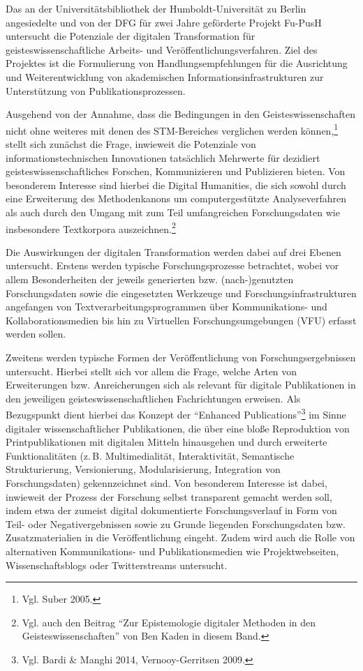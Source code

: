 \documentclass[a4paper,
fontsize=11pt,
oneside,
numbers=noperiodatend,
parskip=half-,
bibliography=totoc,
final
]{scrartcl}
\begin{document}
Das an der Universitätsbibliothek der Humboldt-Universität zu Berlin
angesiedelte und von der DFG für zwei Jahre geförderte Projekt Fu-PusH
untersucht die Potenziale der digitalen Transformation für
geisteswissenschaftliche Arbeits- und Veröffentlichungsverfahren. Ziel
des Projektes ist die Formulierung von Handlungsempfehlungen für die
Ausrichtung und Weiterentwicklung von akademischen
Informationsinfrastrukturen zur Unterstützung von Publikationsprozessen.

Ausgehend von der Annahme, dass die Bedingungen in den
Geisteswissenschaften nicht ohne weiteres mit denen des STM-Bereiches
verglichen werden können,\footnote{Vgl. Suber 2005.} stellt sich
zunächst die Frage, inwieweit die Potenziale von informationstechnischen
Innovationen tatsächlich Mehrwerte für dezidiert
geisteswissenschaftliches Forschen, Kommunizieren und Publizieren
bieten. Von besonderem Interesse sind hierbei die Digital Humanities,
die sich sowohl durch eine Erweiterung des Methodenkanons um
computergestützte Analyseverfahren als auch durch den Umgang mit zum
Teil umfangreichen Forschungsdaten wie insbesondere Textkorpora
auszeichnen.\footnote{Vgl. auch den Beitrag \enquote{Zur Epistemologie
  digitaler Methoden in den Geisteswissenschaften} von Ben Kaden in
  diesem Band.}

Die Auswirkungen der digitalen Transformation werden dabei auf drei
Ebenen untersucht. Erstens werden typische Forschungsprozesse
betrachtet, wobei vor allem Besonderheiten der jeweils generierten bzw.
(nach-)genutzten Forschungsdaten sowie die eingesetzten Werkzeuge und
Forschungsinfrastrukturen angefangen von Textverarbeitungsprogrammen
über Kommuni\-kations- und Kollaborationsmedien bis hin zu Virtuellen
Forschungsumgebungen (VFU) erfasst werden sollen.

Zweitens werden typische Formen der Veröffentlichung von
Forschungsergebnissen untersucht. Hierbei stellt sich vor allem die
Frage, welche Arten von Erweiterungen bzw. Anreicherungen sich als
relevant für digitale Publikationen in den jeweiligen
geisteswissenschaftlichen Fachrichtungen erweisen. Als Bezugspunkt dient
hierbei das Konzept der \enquote{Enhanced Publications}\footnote{Vgl.
  Bardi \& Manghi 2014, Vernooy-Gerritsen 2009.} im Sinne digitaler
wissenschaftlicher Publikationen, die über eine bloße Reproduktion von
Printpublikationen mit digitalen Mitteln hinausgehen und durch
erweiterte Funktionalitäten (z.\,B. Multimedialität, Interaktivität,
Semantische Strukturierung, Versionierung, Modularisierung, Integration
von Forschungsdaten) gekennzeichnet sind. Von besonderem Interesse ist
dabei, inwieweit der Prozess der Forschung selbst transparent gemacht
werden soll, indem etwa der zumeist digital dokumentierte
Forschungsverlauf in Form von Teil- oder Negativergebnissen sowie zu
Grunde liegenden Forschungsdaten bzw. Zusatzmaterialien in die
Veröffentlichung eingeht. Zudem wird auch die Rolle von alternativen
Kommunikations- und Publikationsmedien wie Projektwebseiten,
Wissenschaftsblogs oder Twitterstreams untersucht.
\end{document}
